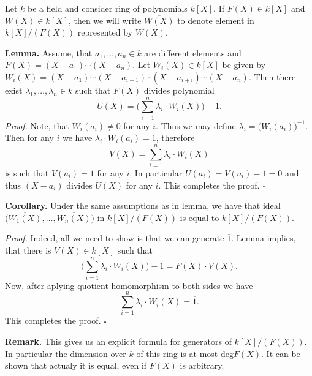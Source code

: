 \documentclass[12pt]{article}
\begin{document}
Let $k$ be a field and consider ring of polynomials $k[X]$. If $F(X)\in k[X]$ and $W(X)\in k[X]$, then we will write $\overline{W(X)}$ to denote element in $k[X]/(F(X))$ represented by $W(X)$.

\textbf{Lemma.} Assume, that $a_1,\ldots, a_n\in k$ are different elements and $F(X)=(X-a_1)\cdots (X-a_n)$. Let $W_i(X)\in k[X]$ be given by $W_i(X)=(X-a_1)\cdots (X-a_{i-1})\cdot (X-a_{i+i})\cdots (X-a_n)$. Then there exist $\lambda_1,\ldots,\lambda_n\in k$ such that $F(X)$ divides polynomial
$$U(X)=\bigg(\sum_{i=1}^{n} \lambda_i\cdot W_i(X)\bigg)-1.$$
\textit{Proof.} Note, that $W_i(a_i)\neq 0$ for any $i$. Thus we may define $\lambda_i=\big(W_i(a_i)\big)^{-1}$. Then for any $i$ we have $\lambda_i\cdot W_i(a_i)=1$, therefore
$$V(X)=\sum_{i=1}^{n} \lambda_i\cdot W_i(X)$$
is such that $V(a_i)=1$ for any $i$. In particular $U(a_i)=V(a_i)-1=0$ and thus $(X-a_i)$ divides $U(X)$ for any $i$. This completes the proof. $\square$

\textbf{Corollary.} Under the same assumptions as in lemma, we have that ideal $\bigg(\overline{W_1(X)},\ldots,\overline{W_n(X)}\bigg)$ in $k[X]/(F(X))$ is equal to $k[X]/(F(X))$.

\textit{Proof.} Indeed, all we need to show is that we can generate $\overline{1}$. Lemma implies, that there is $V(X)\in k[X]$ such that 
$$\bigg(\sum_{i=1}^{n} \lambda_i\cdot W_i(X)\bigg)-1=F(X)\cdot V(X).$$
Now, after aplying quotient homomorphism to both sides we have
$$\sum_{i=1}^{n} \lambda_i\cdot \overline{W_i(X)}=\overline{1}.$$
This completes the proof. $\square$

\textbf{Remark.} This gives us an explicit formula for generators of $k[X]/(F(X))$. In particular the dimension over $k$ of this ring is at most $\mathrm{deg}F(X)$. It can be shown that actualy it is equal, even if $F(X)$ is arbitrary.
\end{document}
